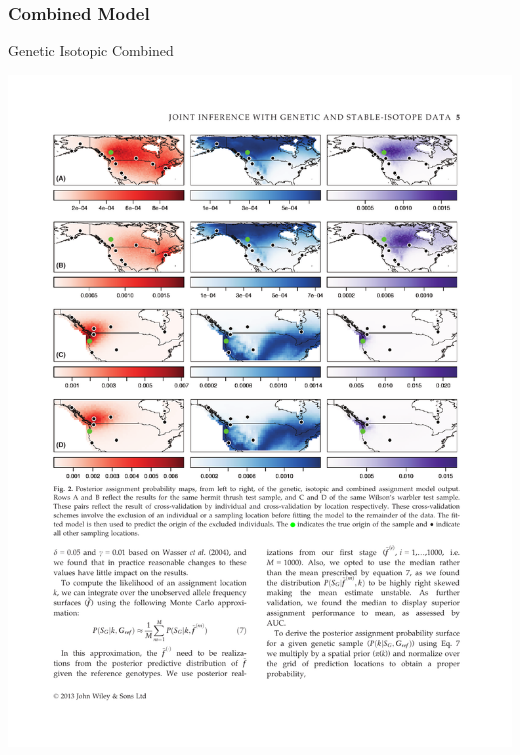 \documentclass[t]{beamer}\usepackage[]{graphicx}\usepackage[]{color}
\begin{document}

% 
%  
% 
% 
% 


\begin{frame}
\frametitle{Combined Model}

\vfill

\begin{center}

Genetic \qquad\qquad\qquad\quad
Isotopic \qquad\qquad\qquad\quad
Combined

\end{center}

\begin{center}
\includegraphics[width=\textwidth]{figs/hermit_maps.pdf}
\end{center}

\vfill

\end{frame}
\end{document}
